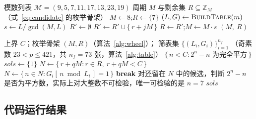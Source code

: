 \documentclass[11pt,a4paper]{ctexart}
\theoremstyle{remark}
\begin{document}
\begin{algorithm}[H]
\caption{枚举骨架构建 \textsc{BuildWheel}}
\label{alg:wheel}
\begin{algorithmic}[1]
\Require 模数列表 $\mathcal{M} = (9, 5, 7, 11, 17, 13, 23, 19)$
\Ensure 周期 $M$ 与剩余集 $R \subseteq \mathbb{Z}_M$（式~\eqref{eq:candidate} 的枚举骨架）
\State $M \gets 8$;\quad $R \gets \{7\}$
\State $(L, G) \gets \Call{BuildTable}{m}$
\State $s \gets L / \gcd(M, L)$
\State $R' \gets \emptyset$
\State $R' \gets R' \cup \{\,r + jM\,\}$
\EndIf
\EndFor
\EndFor
\State $R \gets R'$;\quad $M \gets M \cdot s$
\EndFor
\State \Return $(M,\ R)$
\end{algorithmic}
\end{algorithm}

\begin{algorithm}[H]
\caption{主筛与最终判定 \textsc{Sieve}}
\label{alg:sieve}
\begin{algorithmic}[1]
\Require 上界 $C$；枚举骨架 $(M, R)$（算法~\ref{alg:wheel}）；
\Statex \hspace{\algorithmicindent} 筛表集 $\{(L_i, G_i)\}_{i=1}^{n_f}$
（奇素数 $23 < p \le 421$，共 $n_f = 73$ 张，算法~\ref{alg:table}）
\Ensure $\{\, n < C : 2^n - n \text{ 为完全平方} \,\}$
\State $\mathit{sols} \gets \{1\}$
\Comment{把 $[0,C)$ 分为若干段逐段处理；各段互不依赖}
\State $N \gets \{\, r + qM : r \in R,\ r + qM < C \,\}$
\State $N \gets \{\, n \in N : G_i[\,n \bmod L_i\,] = 1 \,\}$
 \textbf{break}
\EndIf
\EndFor
\State 对还留在 $N$ 中的候选，判断 $2^n-n$ 是否为平方数，实际上对大整数不可检验，唯一可检验的是 $n=7$
\EndFor
\State \Return $\mathit{sols}$
\end{algorithmic}
\end{algorithm}

\subsection{代码运行结果}
\end{document}
